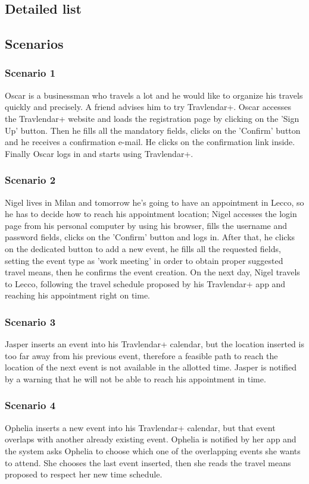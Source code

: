 \subsection{Detailed list}
\label{subsect:Detailed list}


\subsection{Scenarios}
\label{subsect:Scenarios}
	\subsubsection{Scenario 1}
		Oscar is a businessman who travels a lot and he would like to organize his travels quickly and precisely. A friend advises him to try Travlendar+. Oscar accesses the Travlendar+ website and loads the registration page by clicking on the 'Sign Up' button. Then he fills all the mandatory fields, clicks on the 'Confirm' button and he receives a confirmation e-mail. He clicks on the confirmation link inside.
Finally Oscar logs in and starts using Travlendar+.
	\subsubsection{Scenario 2}
		Nigel lives in Milan and tomorrow he's going to have an appointment in Lecco, so he has to decide how to reach his appointment location; Nigel accesses the login page from his personal computer by using his browser, fills the username and password fields, clicks on the 'Confirm' button and logs in. After that, he clicks on the dedicated button to add a new event, he fills all the requested fields, setting the event type as 'work meeting' in order to obtain proper suggested travel means, then he confirms the event creation. On the next day, Nigel travels to Lecco, following the travel schedule proposed by his Travlendar+ app and reaching his appointment right on time.
	\subsubsection{Scenario 3}
		Jasper inserts an event into his Travlendar+ calendar, but the location inserted is too far away from his previous event, therefore a feasible path to reach the location of the next event is not available in the allotted time. Jasper is notified by a warning that he will not be able to reach his appointment in time.	
	\subsubsection{Scenario 4}
		Ophelia inserts a new event into his Travlendar+ calendar, but that event overlaps with another already existing event. Ophelia is notified by her app and the system asks Ophelia to choose which one of the overlapping events she wants to attend. She chooses the last event inserted, then she reads the travel means proposed to respect her new time schedule.
